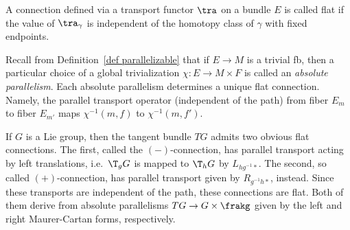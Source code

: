 \begin{defn}
    A connection defined via a transport functor $\tra$ on a bundle $E$ is called flat if the value of $\tra_\gamma$ is independent of the homotopy class of $\gamma$ with fixed endpoints.
\end{defn}


\begin{example}
    Recall from Definition~\ref{def parallelizable} that if $E\to M$ is a trivial \gls{fb}, then a particular choice of a global trivialization $\chi:E\to M\times F$ is called an \emph{absolute parallelism}. Each absolute parallelism determines a unique flat connection. Namely, the parallel transport operator (independent of the path) from fiber $E_m$ to fiber $E_{m'}$ maps $\chi^{-1}(m,f)$ to $\chi^{-1}(m,f')$.
\end{example}

\begin{example}\label{ex flat connections on G}
    If $G$ is a Lie group, then the tangent bundle $TG$ admits two obvious flat connections. The first, called the $(-)$-connection, has parallel transport acting by left translations, i.e.\ $\T_g G$ is mapped to $\T_h G$ by $L_{hg^{-1}\ast}$. The second, so called $(+)$-connection, has parallel transport given by $R_{g^{-1}h\ast}$, instead. Since these transports are independent of the path, these connections are flat. Both of them derive from absolute parallelisms $TG\to G\times\frakg$ given by the left and right Maurer-Cartan forms, respectively.
\end{example}



